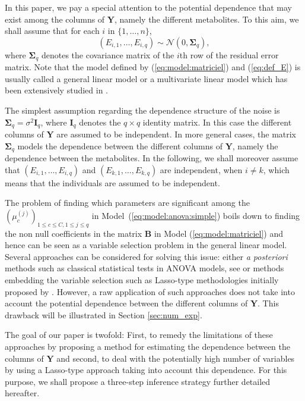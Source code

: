 In this paper, we pay a special attention to the potential dependence that may exist
among the columns of $\boldsymbol{Y}$, namely the different metabolites. To this aim, we shall assume that
for each $i$ in $\{1,\dots,n\}$,
\begin{equation}\label{eq:def_E}
(E_{i,1},\dots,E_{i,q})\sim\mathcal{N}(0,\boldsymbol{\Sigma}_q),
\end{equation}
where $\boldsymbol{\Sigma}_q$ denotes the covariance matrix of the
$i$th row of the residual error matrix. Note that the model defined
by (\ref{eq:model:matriciel}) and (\ref{eq:def_E}) is usually called 
a general linear model or a multivariate linear model which 
has been extensively studied in \cite{mardia:kent:1979}.


The simplest assumption regarding the dependence structure of the
noise is $\boldsymbol{\Sigma}_q=\sigma^2\boldsymbol{I}_q$, where $\boldsymbol{I}_q$
denotes the $q\times q$ identity matrix. In this case the different columns of $\boldsymbol{Y}$ are assumed to be independent.
In more general cases, the matrix
$\boldsymbol{\Sigma}_q$ models the dependence between the different
columns of $\boldsymbol{Y}$, namely the dependence between the metabolites.
In the following, we shall moreover assume that
$(E_{i,1},\ldots,E_{i,q})$ and $(E_{k,1},\ldots,E_{k,q})$ are independent, when $i\neq k$, which
means that the individuals are assumed to be independent.

The problem of finding which parameters are significant among the $(\mu_c^{(j)})_{1\leq
  c\leq C,1\leq j\leq q}$  in Model~(\ref{eq:model:anova:simple})
boils down to finding the non null coefficients in the matrix
$\boldsymbol{B}$ in Model (\ref{eq:model:matriciel}) and hence can be seen as a variable selection problem
in the general linear model.
Several approaches can be considered for solving this issue: either 
\textit{a posteriori} methods such as classical statistical tests in ANOVA
models, see \cite{mardia:kent:1979,faraway:2005}
or methods embedding the variable selection such as Lasso-type
methodologies initially proposed by \cite{Tib96}. However, a raw application of such approaches does not 
take into account the potential dependence between the
different columns of $\boldsymbol{Y}$. This drawback will be illustrated in Section
\ref{sec:num_exp}.


The goal of our paper is twofold: First, to remedy the limitations of these approaches
by proposing a method for estimating the dependence between the columns
of $\boldsymbol{Y}$ and second, to deal with the potentially high number of
variables by using a Lasso-type approach taking into
  account this dependence. For this purpose, we shall propose a three-step inference
strategy further detailed hereafter.

